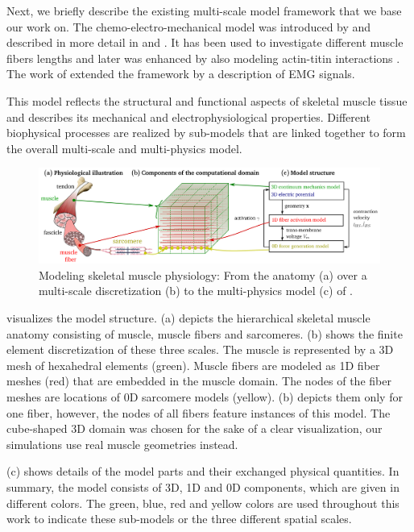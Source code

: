 Next, we briefly describe the existing multi-scale model framework that we base our work on.
The chemo-electro-mechanical model was introduced by \cite{Roehrle2012} and described in more detail in \cite{Heidlauf2013} and \cite{Heidlauf2015Diss}. It has been used to investigate different muscle fibers lengths \cite{Heidlauf2014} and later was enhanced by also modeling actin-titin interactions \cite{Heidlauf2016}. The work of \cite{Mordhorst2015} extended the framework by a description of EMG signals.

This model reflects the structural and functional aspects of skeletal muscle tissue and describes its mechanical and electrophysiological properties. Different biophysical processes are realized by sub-models that are linked together to form the overall multi-scale and multi-physics model.

\begin{figure}
  \centering%
  \includegraphics[width=\textwidth]{images/introduction/model_scheme_overview.pdf}%
  \caption{Modeling skeletal muscle physiology: From the anatomy (a) over a multi-scale discretization (b) to the multi-physics model (c) of \cite{Roehrle2012}.}%
  \label{fig:model_scheme_overview_full}%
\end{figure}%

 visualizes the model structure.  (a) depicts the hierarchical skeletal muscle anatomy consisting of muscle, muscle fibers and sarcomeres.  (b) shows the finite element discretization of these three scales. The muscle is represented by a 3D mesh of hexahedral elements (green). Muscle fibers are modeled as 1D fiber meshes (red) that are embedded in the muscle domain. The nodes of the fiber meshes are locations of 0D sarcomere models (yellow).  (b) depicts them only for one fiber, however, the nodes of all fibers feature instances of this model. The cube-shaped 3D domain was chosen for the sake of a clear visualization, our simulations use real muscle geometries instead.

 (c) shows details of the model parts and their exchanged physical quantities. In summary, the model consists of 3D, 1D and 0D components, which are given in different colors.
The green, blue, red and yellow colors are used throughout this work to indicate these sub-models or the three different spatial scales.

